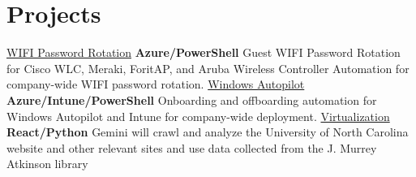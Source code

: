 \section{Projects}
\resumeSubHeadingListStart
    \resumeProjectHeading
    {\href{https://github.com/MurtadhaM/Infrastructure/}{ WIFI Password Rotation} { \faGithub}}{}
    {\textbf{Azure/PowerShell}}
        { Guest WIFI Password Rotation for Cisco WLC, Meraki, ForitAP, and Aruba Wireless Controller Automation for company-wide WIFI password rotation.}
            \resumeProjectHeading
            {\href{https://github.com/MurtadhaM/Infrastructure/Automation/WindowsAutopilot}{  Windows Autopilot} { \faGithub}}{}
            {\textbf{Azure/Intune/PowerShell}}
        {Onboarding and offboarding automation for Windows Autopilot and Intune for company-wide deployment.}
    \resumeProjectHeading
        {\href{https://github.com/MurtadhaM/Virtualization}{  Virtualization}{ \faGithub}}{}
        {\textbf{React/Python}}
        {Gemini will crawl and analyze the University of North Carolina website and other relevant sites and use data collected from the J. Murrey Atkinson library}
\resumeSubHeadingListEnd
